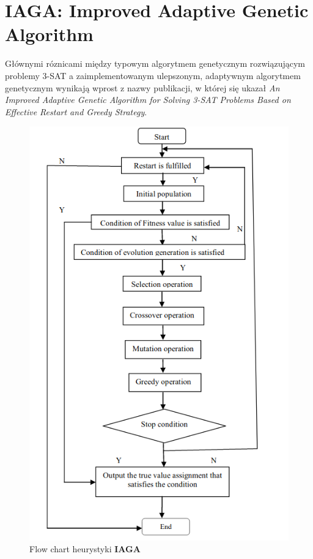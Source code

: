 \documentclass[10pt]{article}
\begin{document}
\section{\textbf{IAGA}: Improved Adaptive Genetic Algorithm}
Głównymi róznicami między typowym algorytmem genetycznym rozwiązującym problemy 3-SAT a zaimplementowanym ulepszonym, adaptywnym algorytmem genetycznym wynikają wprost z nazwy publikacji, w której się ukazał \textit{An Improved Adaptive Genetic Algorithm for Solving 3-SAT Problems Based on Effective Restart and Greedy Strategy}.
\begin{figure}[h]
\centering
\includegraphics[scale=0.5]{img/iaga.png} \\
Flow chart heurystyki \textbf{IAGA}
\end{figure}
\end{document}

